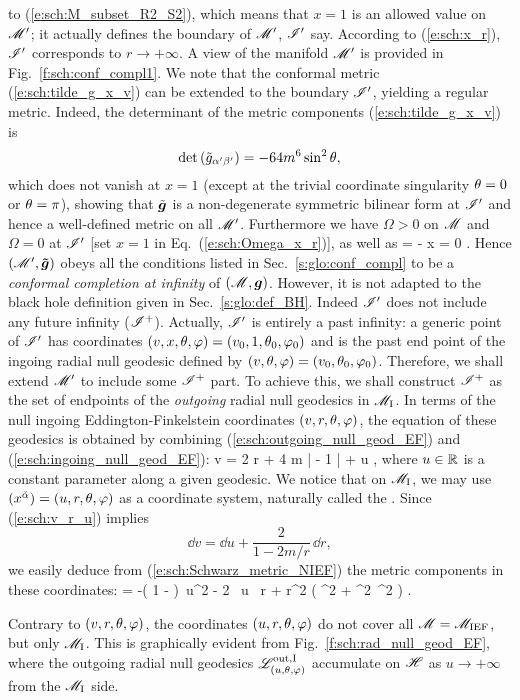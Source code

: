 to (\ref{e:sch:M_subset_R2_S2}), which means
that $x=1$ is an allowed value on $\mathscr{M}'$; it actually defines the boundary of
$\mathscr{M}'$, $\mathscr{I}'$ say.
According to (\ref{e:sch:x_r}),
$\mathscr{I}'$ corresponds to $r\rightarrow +\infty$.
A view of the manifold $\mathscr{M}'$ is
provided in Fig.~\ref{f:sch:conf_compl1}.
We note that the conformal metric (\ref{e:sch:tilde_g_x_v}) can be extended
to the boundary $\mathscr{I}'$, yielding a regular metric. Indeed, the determinant of
the metric components (\ref{e:sch:tilde_g_x_v}) is
\[
    \det\left({\tilde{g}}_{\alpha'\beta'}\right) = - 64 m^6 \sin^2\theta ,
\]
which does not vanish at $x=1$ (except at the trivial coordinate singularity
$\theta=0$ or $\theta=\pi$), showing that $\tilde{\bm{g}}$ is a non-degenerate
symmetric bilinear form at $\mathscr{I}'$ and hence a well-defined metric on all
$\mathscr{M}'$.
Furthermore
we have $\Omega >0$ on $\mathscr{M}$ and $\Omega=0$ at $\mathscr{I}'$ [set $x=1$ in Eq.~(\ref{e:sch:Omega_x_r})], as well as
\be
    \dd \Omega = - \dd x \not = 0 .
\ee
Hence $(\mathscr{M}',\bm{\tilde{g}})$ obeys all the conditions
listed in Sec.~\ref{s:glo:conf_compl} to be a \emph{conformal completion at infinity}
of $(\mathscr{M},\bm{g})$.
However, it is not adapted to the black hole definition given in Sec.~\ref{s:glo:def_BH}. Indeed
$\mathscr{I}'$ does not include any future infinity ($\mathscr{I}^+$). Actually, $\mathscr{I}'$ is
entirely a past infinity: a generic point of $\mathscr{I}'$ has coordinates
$(v,x,\theta,\varphi) = (v_0,1,\theta_0,\varphi_0)$ and is the past end point of the
ingoing radial null geodesic defined by
$(v,\theta,\varphi) = (v_0,\theta_0,\varphi_0)$.
Therefore, we shall extend $\mathscr{M}'$ to include some $\mathscr{I}^+$ part.
To achieve this, we shall construct $\mathscr{I}^+$ as the set of endpoints of the
\emph{outgoing} radial null geodesics in $\mathscr{M}_{\rm I}$. In terms of
the null ingoing Eddington-Finkelstein coordinates $(v,r,\theta,\varphi)$,
the equation of these geodesics is obtained by combining (\ref{e:sch:outgoing_null_geod_EF}) and (\ref{e:sch:ingoing_null_geod_EF}):
\be \label{e:sch:v_r_u}
    v = 2 r + 4 m \ln \left|  - 1 \right| + u ,
\ee
where $u\in\mathbb{R}$ is a constant parameter along a given geodesic.
We notice that on $\mathscr{M}_{\rm I}$, we may use $(x^{\check{\alpha}}) = (u,r,\theta,\varphi)$ as a coordinate
system, naturally called the . Since (\ref{e:sch:v_r_u}) implies
\[
    \dd v = \dd u + \frac{2}{1-2m/r}\, \dd r,
\]
we easily deduce from (\ref{e:sch:Schwarz_metric_NIEF}) the metric components
in these coordinates:
\be \label{e:sch:g_u_r}
     = -\left( 1 -  \right)\, \dd u^2
            - 2 \, \dd u \, \dd r
        + r^2 \left( \dd\th^2 + \sin^2\th\, \dd\ph^2 \right) .
\ee
\begin{remark}
Contrary to $(v,r,\theta,\varphi)$, the coordinates $(u,r,\theta,\varphi)$ do not cover
all $\mathscr{M} = \mathscr{M}_{\rm IEF}$, but only $\mathscr{M}_{\rm I}$. This is graphically
evident from
Fig.~\ref{f:sch:rad_null_geod_EF}, where the outgoing radial null geodesics
$\mathscr{L}^{\rm out,I}_{(u,\theta,\varphi)}$
accumulate on $\mathscr{H}$ as $u\rightarrow +\infty$
from the $\mathscr{M}_{\rm I}$ side.
\end{remark}

